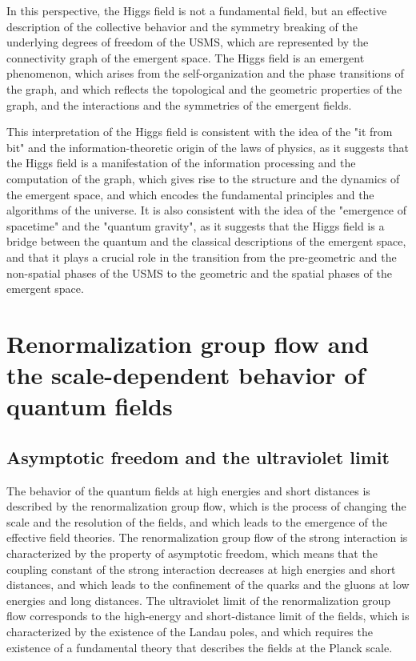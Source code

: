 \begin{tcolorbox}[colback=green!5!white,colframe=green!75!black,title=Question]
    In this perspective, the Higgs field is not a fundamental field, but an effective description of the collective behavior and the symmetry breaking of the underlying degrees of freedom of the USMS, which are represented by the connectivity graph of the emergent space. The Higgs field is an emergent phenomenon, which arises from the self-organization and the phase transitions of the graph, and which reflects the topological and the geometric properties of the graph, and the interactions and the symmetries of the emergent fields.

    This interpretation of the Higgs field is consistent with the idea of the "it from bit" and the information-theoretic origin of the laws of physics, as it suggests that the Higgs field is a manifestation of the information processing and the computation of the graph, which gives rise to the structure and the dynamics of the emergent space, and which encodes the fundamental principles and the algorithms of the universe. It is also consistent with the idea of the "emergence of spacetime" and the "quantum gravity", as it suggests that the Higgs field is a bridge between the quantum and the classical descriptions of the emergent space, and that it plays a crucial role in the transition from the pre-geometric and the non-spatial phases of the USMS to the geometric and the spatial phases of the emergent space.
\end{tcolorbox}

\section{Renormalization group flow and the scale-dependent behavior of quantum fields}
\subsection{Asymptotic freedom and the ultraviolet limit}
The behavior of the quantum fields at high energies and short distances is described by the renormalization group flow, which is the process of changing the scale and the resolution of the fields, and which leads to the emergence of the effective field theories. The renormalization group flow of the strong interaction is characterized by the property of asymptotic freedom, which means that the coupling constant of the strong interaction decreases at high energies and short distances, and which leads to the confinement of the quarks and the gluons at low energies and long distances. The ultraviolet limit of the renormalization group flow corresponds to the high-energy and short-distance limit of the fields, which is characterized by the existence of the Landau poles, and which requires the existence of a fundamental theory that describes the fields at the Planck scale.

